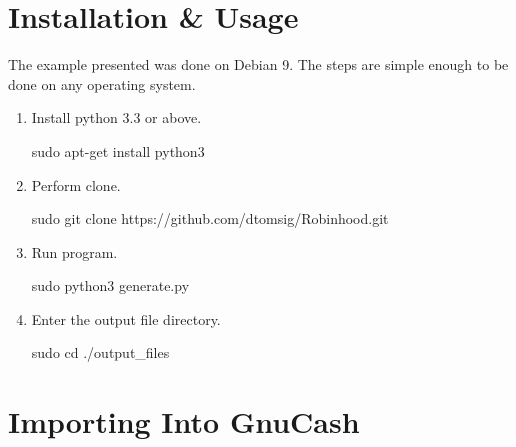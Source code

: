 \documentclass{article}
\begin{document}
        \section{Installation \& Usage}
            The example presented was done on Debian 9. The steps are simple 
            enough to be done on any operating system.
            \newline
            \begin{enumerate}
                \item
                    Install python 3.3 or above.
                    \newline  
                    \begin{tcolorbox}[colback = cyan] 
                        sudo apt-get install python3
                    \end{tcolorbox}
                \item
                    Perform clone.
                    \newline  
                    \begin{tcolorbox}[colback = cyan] 
                        sudo git clone https://github.com/dtomsig/Robinhood.git
                    \end{tcolorbox}
                \item
                    Run program.
                    \newline  
                    \begin{tcolorbox}[colback = cyan] 
                        sudo python3 generate.py
                    \end{tcolorbox}
                \item
                    Enter the output file directory.
                    \newline  
                    \begin{tcolorbox}[colback = cyan] 
                        sudo cd ./output\_files
                    \end{tcolorbox}
            \end{enumerate}
        \newpage
        \section{Importing Into GnuCash}
    
\end{document}
